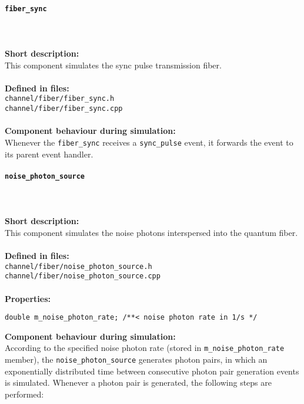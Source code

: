 \paragraph{\texttt{fiber\_sync}}
\noindent \\
\\
\textbf{Short description:}\\
This component simulates the sync pulse transmission fiber.\\
\\
\textbf{Defined in files:}\\
\texttt{channel/fiber/fiber\_sync.h}\\
\texttt{channel/fiber/fiber\_sync.cpp}\\
\\
\textbf{Component behaviour during simulation:}\\
Whenever the \texttt{fiber\_sync} receives a \texttt{sync\_pulse} event, it forwards the event to its parent event handler.

\paragraph{\texttt{noise\_photon\_source}}
\noindent \\
\\
\textbf{Short description:}\\
This component simulates the noise photons interspersed into the quantum fiber.\\
\\
\textbf{Defined in files:}\\
\texttt{channel/fiber/noise\_photon\_source.h}\\
\texttt{channel/fiber/noise\_photon\_source.cpp}\\
\\
\textbf{Properties:}
\begin{lstlisting}
double m_noise_photon_rate; /**< noise photon rate in 1/s */
\end{lstlisting}
\noindent
\textbf{Component behaviour during simulation:}\\
According to the specified noise photon rate (stored in \texttt{m\_noise\_photon\_rate} member), the \texttt{noise\_photon\_source} generates photon pairs, in which an exponentially distributed time between consecutive photon pair generation events is simulated. Whenever a photon pair is generated, the following steps are performed:


